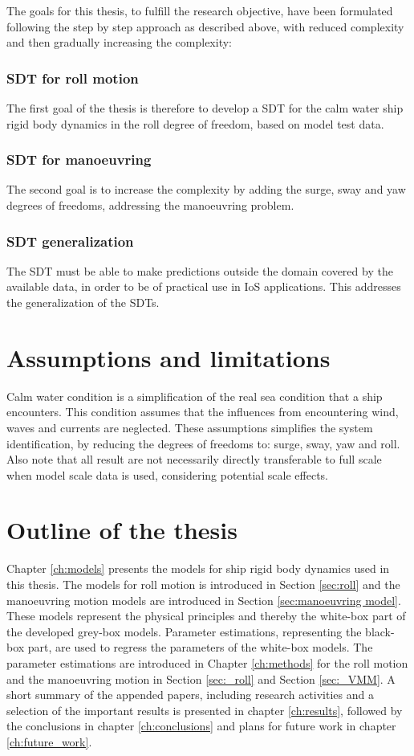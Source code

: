 \noindent 
The goals for this thesis, to fulfill the research objective, have been formulated following the step by step approach as described above, with reduced complexity and then gradually increasing the complexity:

\subsubsection*{SDT for roll motion}
The first goal of the thesis is therefore to develop a SDT for the calm water ship rigid body dynamics in the roll degree of freedom, based on model test data.

\subsubsection*{SDT for manoeuvring}
The second goal is to increase the complexity by adding the surge, sway and yaw degrees of freedoms, addressing the manoeuvring problem.

\subsubsection*{SDT generalization}
The SDT must be able to make predictions outside the domain covered by the available data, in order to be of practical use in IoS applications. This addresses the generalization of the SDTs.

\section{Assumptions and limitations}
Calm water condition is a simplification of the real sea condition that a ship encounters. This condition assumes that the influences from encountering wind, waves and currents are neglected. These assumptions simplifies the system identification, by reducing the degrees of freedoms to: surge, sway, yaw and roll. Also note that all result are not necessarily directly transferable to full scale when model scale data is used, considering potential scale effects. 

\section{Outline of the thesis}
Chapter \ref{ch:models} presents the models for ship rigid body dynamics used in this thesis. The models for roll motion is introduced in Section \ref{sec:roll} and the manoeuvring motion models are introduced in Section \ref{sec:manoeuvring model}. These models represent the physical principles and thereby the white-box part of the developed grey-box models.
Parameter estimations, representing the black-box part, are used to regress the parameters of the white-box models. The parameter estimations are introduced in Chapter \ref{ch:methods} for the roll motion and the manoeuvring motion in Section \ref{sec:_roll} and Section \ref{sec:_VMM}. 
A short summary of the appended papers, including research activities and a selection of the important results is presented in chapter \ref{ch:results}, followed by the conclusions in chapter \ref{ch:conclusions} and plans for future work in chapter \ref{ch:future_work}.
